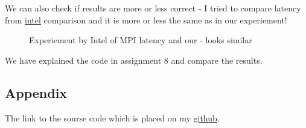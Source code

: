 \documentclass[%
12pt, %
final, %
oneside, %
onecolumn, %
centertags]{article} %
\theoremstyle{plain}
\theoremstyle{definition}
\theoremstyle{remark}
\begin{document}
We can also check if results are more or less correct - I tried to compare latency from \href{https:\//www.intel.com/content/www/us/en/high-performance-computing-fabrics/omni-path-architecture-performance-overview.html}{intel} comparison and it is more or less the same as in our experiement!

\begin{figure}[h!]
\centering
{} 

Experiement by Intel of MPI latency and our - looks similar
\end{figure}

We have explained the code in assignment 8 and compare the results.

\subsection{Appendix}

The link to the sourse code which is placed on my \href{https://github.com/aptmess/parallel_algorithms}{github}.
\end{document}
